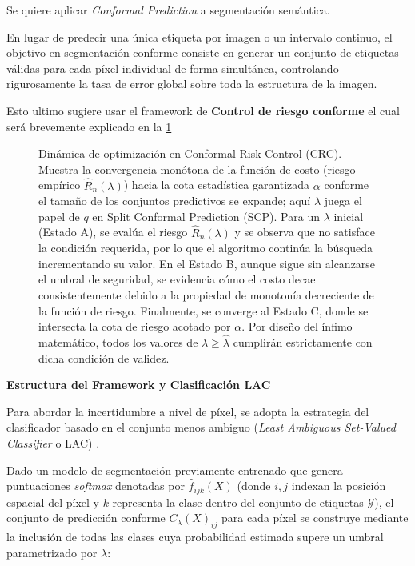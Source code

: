 Se quiere aplicar \textit{Conformal Prediction} a segmentación semántica.

En lugar de predecir una única etiqueta por imagen o un intervalo continuo, el objetivo en segmentación conforme consiste en generar un conjunto de etiquetas válidas para cada píxel individual de forma simultánea, controlando rigurosamente la tasa de error global sobre toda la estructura de la imagen.

Esto ultimo sugiere usar el framework de \textbf{Control de riesgo conforme} el cual será brevemente explicado en la \ref{fig:crc_optimization_flow}

\begin{figure}[H]
    \centering
    \resizebox{1.0\textwidth}{!}{}
    \caption{Dinámica de optimización en Conformal Risk Control (CRC). Muestra la convergencia monótona de la función de costo (riesgo empírico $\hat{R}_n (\lambda)$) hacia la cota estadística garantizada $\alpha$ conforme el tamaño de los conjuntos predictivos se expande; aquí $\lambda$ juega el papel de $q$ en Split Conformal Prediction (SCP).
    \newline\newline
    Para un $\lambda$ inicial (Estado A), se evalúa el riesgo $\hat{R}_n (\lambda)$ y se observa que no satisface la condición requerida, por lo que el algoritmo continúa la búsqueda incrementando su valor.
    \newline\newline
    En el Estado B, aunque sigue sin alcanzarse el umbral de seguridad, se evidencia cómo el costo decae consistentemente debido a la propiedad de monotonía decreciente de la función de riesgo.
    \newline\newline
    Finalmente, se converge al Estado C, donde se intersecta la cota de riesgo acotado por $\alpha$. Por diseño del ínfimo matemático, todos los valores de $\lambda \geq \hat{\lambda}$ cumplirán estrictamente con dicha condición de validez.}
    \label{fig:crc_optimization_flow}
\end{figure}



\textbf{Estructura del Framework y Clasificación LAC}

Para abordar la incertidumbre a nivel de píxel, se adopta la estrategia del clasificador basado en el conjunto menos ambiguo (\textit{Least Ambiguous Set-Valued Classifier} o LAC) .

Dado un modelo de segmentación previamente entrenado que genera puntuaciones \textit{softmax} denotadas por $\hat{f}_{ijk}(X)$ (donde $i,j$ indexan la posición espacial del píxel y $k$ representa la clase dentro del conjunto de etiquetas $\mathcal{Y}$), el conjunto de predicción conforme $C_\lambda(X)_{ij}$ para cada píxel se construye mediante la inclusión de todas las clases cuya probabilidad estimada supere un umbral parametrizado por $\lambda$:

